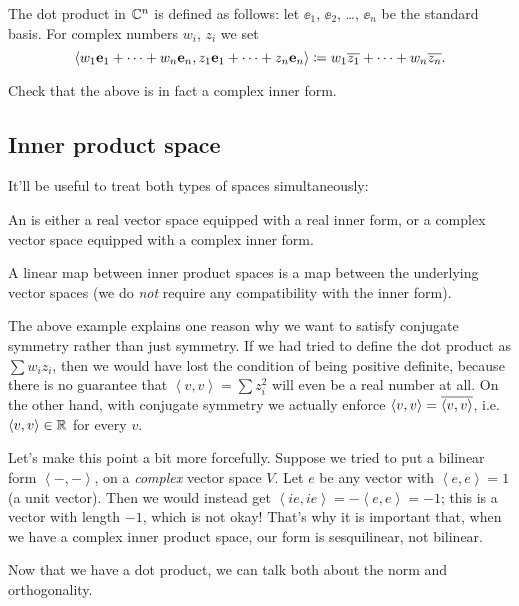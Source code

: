 \begin{example}
	[$\CC^n$]
	The dot product in $\CC^n$ is defined as follows:
	let $\ee_1$, $\ee_2$, \dots, $\ee_n$ be the standard basis.
	For complex numbers $w_i$, $z_i$ we set
	\[
		\left< w_1 \mathbf e_1 + \dots + w_n \mathbf e_n, z_1 \mathbf e_1 + \dots + z_n \mathbf e_n \right>
		\coloneqq w_1\overline{z_1} + \dots + w_n \overline{z_n}.
	\]
\end{example}
\begin{ques}
	Check that the above is in fact a complex inner form.
\end{ques}

\subsection{Inner product space}
It'll be useful to treat both types of spaces simultaneously:
\begin{definition}
	An  is either a real vector space
	equipped with a real inner form,
	or a complex vector space equipped with a complex inner form.

	A linear map between inner product spaces
	is a map between the underlying vector spaces
	(we do \emph{not} require any compatibility with the inner form).
\end{definition}

\begin{remark}
	The above example explains one reason why we want
	to satisfy conjugate symmetry rather than just symmetry.
	If we had tried to define the dot product as $\sum w_i z_i$,
	then we would have lost the condition of being positive definite,
	because there is no guarantee that
	$\left< v,v \right> = \sum z_i^2$ will even be a real number at all.
	On the other hand, with conjugate symmetry
	we actually enforce $\left< v,v \right> = \overline{\left< v,v \right>}$,
	i.e.\ $\left< v,v \right> \in \mathbb R$ for every $v$.

	Let's make this point a bit more forcefully.
	Suppose we tried to put a bilinear form $\left< -, -\right>$,
	on a \emph{complex} vector space $V$.
	Let $e$ be any vector with $\left< e, e \right> = 1$ (a unit vector).
	Then we would instead get
	$\left< ie, ie \right> = - \left< e,e \right> = -1$;
	this is a vector with length $-1$, which is not okay!
	That's why it is important that,
	when we have a complex inner product space,
	our form is sesquilinear, not bilinear.
\end{remark}

Now that we have a dot product,
we can talk both about the norm and orthogonality.

